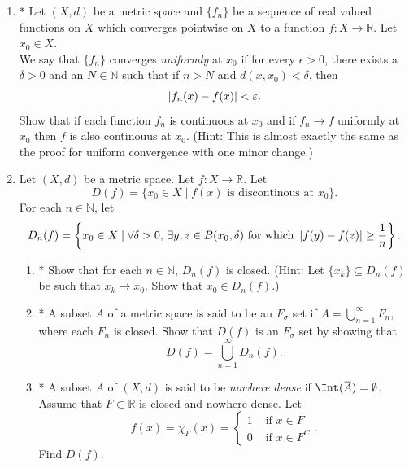 \documentclass[notoc,notitlepage]{tufte-book}
\begin{document}
\begin{enumerate}
  \item * Let $(X, d)$ be a metric space and $\{ f_n \}$ be a sequence of real valued functions on $X$ which converges pointwise on $X$ to a function $f : X \to \mathbb{R}$. Let $x_0 \in X$. \\
    We say that $\{ f_n \}$ converges \textit{uniformly} at $x_0$ if for every $\epsilon > 0$, there exists a $\delta > 0$ and an $N \in \mathbb{N}$ such that if $n > N$ and $d(x, x_0) < \delta$, then
    \begin{equation*}
      \left| f_n(x) - f(x) \right| < \varepsilon.
    \end{equation*}
    Show that if each function $f_n$ is continuous at $x_0$ and if $f_n \to f$ uniformly at $x_0$ then $f$ is also continouus at $x_0$. (Hint: This is almost exactly the same as the proof for uniform convergence with one minor change.)

  \item Let $(X, d)$ be a metric space. Let $f : X \to \mathbb{R}$. Let
    \begin{equation*}
      D(f) = \{ x_0 \in X \mid f(x) \text{ is discontinous at } x_0 \}.
    \end{equation*}
    For each $n \in \mathbb{N}$, let
    \begin{equation*}
    D_n(f) = \left\{ x_0 \in X \mid \forall \delta > 0, \, \exists y, z \in B(x_0, \delta) \text{ for which } \left| f(y) - f(z)\right| \geq \frac{1}{n} \right\}.
    \end{equation*}
    \begin{enumerate}
      \item * Show that for each $n \in \mathbb{N}$, $D_n(f)$ is closed. (Hint: Let $\{ x_k \} \subseteq D_n(f)$ be such that $x_k \to x_0$. Show that $x_0 \in D_n(f)$.)
      \item * A subset $A$ of a metric space is said to be an $F_\sigma$ set if $A = \bigcup\limits_{n = 1}^{\infty} F_n$, where each $F_n$ is closed. Show that $D(f)$ is an $F_\sigma$ set by showing that
        \begin{equation*}
          D(f) = \bigcup_{n = 1}^{\infty} D_n(f).
        \end{equation*}
      \item * A subset $A$ of $(X, d)$ is said to be \textit{nowhere dense} if $\Int(\bar{A}) = \emptyset$. Assume that $F \subset \mathbb{R}$ is closed and nowhere dense. Let
        \begin{equation*}
          f(x) = \chi_F(x) = \begin{cases}
            1 & \text{ if } x \in F \\
            0 & \text{ if } x \in F^C
          \end{cases}.
        \end{equation*}
        Find $D(f)$.


\end{enumerate}
\end{enumerate}
\end{document}
